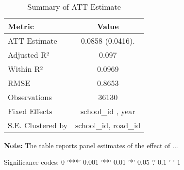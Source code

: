 \begin{table}[H]
\centering
\caption{Summary of ATT Estimate}
\label{tab:SA_inse_100p}
 \begin{center}
 \begin{tabular}{lc}
 \toprule
Metric & Value \\
\midrule
ATT Estimate & 0.0858 (0.0416). \\
\hline 
 Adjusted R² & 0.097 \\
Within R² & 0.0969 \\
RMSE & 0.8653 \\
Observations & 36130 \\
\hline 
 Fixed Effects & school_id ,  year \\
S.E. Clustered by & school_id, road_id \\
\bottomrule
\end{tabular}
 \end{center}\begin{tablenotes}
\small
\item \textbf{Note:} The table reports panel estimates of the effect of ...
\item Significance codes: 0 '***' 0.001 '**' 0.01 '*' 0.05 '.' 0.1 ' ' 1
\end{tablenotes}
\end{table}